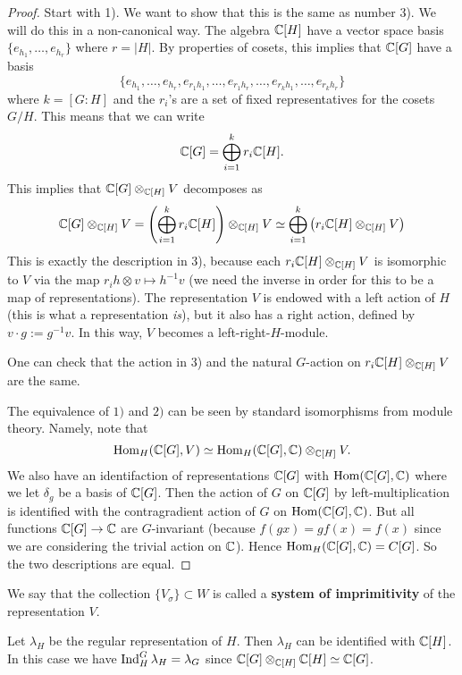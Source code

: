 \documentclass[11pt, english]{article}
\begin{document}
\begin{proof}
Start with 1). We want to show that this is the same as number 3). We will do this in a non-canonical way. The algebra $\mathbb{C}[H]$ have a vector space basis $\{e_{h_1}, \ldots, e_{h_r}\}$ where $r=\lvert H \rvert$. By properties of cosets, this implies that $\mathbb{C}[G]$ have a basis 
$$\{e_{h_1},\ldots, e_{h_r},e_{r_1h_1},\ldots, e_{r_1h_r},\ldots,e_{r_kh_1},\ldots,e_{r_kh_r} \}$$
where $k=[G:H]$ and the $r_i$'s are a set of fixed representatives for the cosets $G/H$. This means that we can write
$$
\mathbb{C}[G] = \bigoplus_{i=1}^k r_i \mathbb{C}[H].
$$
This implies that $\mathbb{C}[G] \otimes_{\mathbb{C}[H]} V$ decomposes as
$$
\mathbb{C}[G] \otimes_{\mathbb{C}[H]} V = \left(\bigoplus_{i=1}^k r_i \mathbb{C}[H]\right) \otimes_{\mathbb{C}[H]} V \simeq \bigoplus_{i=1}^k \left( r_i \mathbb{C}[H] \otimes_{\mathbb{C}[H]} V \right)
$$
This is exactly the description in 3), because each $r_i \mathbb{C}[H] \otimes_{\mathbb{C}[H]} V$ is isomorphic to $V$ via the map $r_ih \otimes v \mapsto h^{-1}v$ (we need the inverse in order for this to be a map of representations). The representation $V$ is endowed with a left action of $H$ (this is what a representation \emph{is}), but it also has a right action, defined by $v \cdot g := g^{-1}v$. In this way, $V$ becomes a left-right-$H$-module.

One can check that the action in 3) and the natural $G$-action on $r_i\mathbb{C}[H] \otimes_{\mathbb{C}[H]} V$ are the same.

The equivalence of $1)$ and $2)$ can be seen by standard isomorphisms from module theory. Namely, note that 
$$
\operatorname{Hom}_H(\mathbb{C}[G],V) \simeq \operatorname{Hom}_H(\mathbb{C}[G],\mathbb{C}) \otimes_{\mathbb{C}[H]} V.
$$
We also have an identifaction of representations $\mathbb{C}[G]$ with $\operatorname{Hom}(\mathbb{C}[G],\mathbb{C})$ where we let $\delta_g$ be a basis of $\mathbb{C}[G]$. Then the action of $G$ on $\mathbb{C}[G]$ by left-multiplication is identified with the contragradient action of $G$ on $\operatorname{Hom}(\mathbb{C}[G],\mathbb{C})$. But all functions $\mathbb{C}[G] \to \mathbb{C}$ are $G$-invariant (because $f(gx)=gf(x)=f(x)$ since we are considering the trivial action on $\mathbb{C}$). Hence $\operatorname{Hom}_H(\mathbb{C}[G],\mathbb{C})=C[G]$. So the two descriptions are equal.
\end{proof}

We say that the collection $\{ V_\sigma \}\subset W$  is called a \textbf{system of imprimitivity} of the representation $V$. 

\begin{example}
Let $\lambda_H$ be the regular representation of $H$. Then $\lambda_H$ can be identified with $\mathbb{C}[H]$. In this case we have $\operatorname{Ind}_H^G \lambda_H = \lambda_G$ since $\mathbb{C}[G] \otimes_{\mathbb{C}[H]} \mathbb{C}[H] \simeq \mathbb{C}[G]$.
\end{example}
\end{document}
